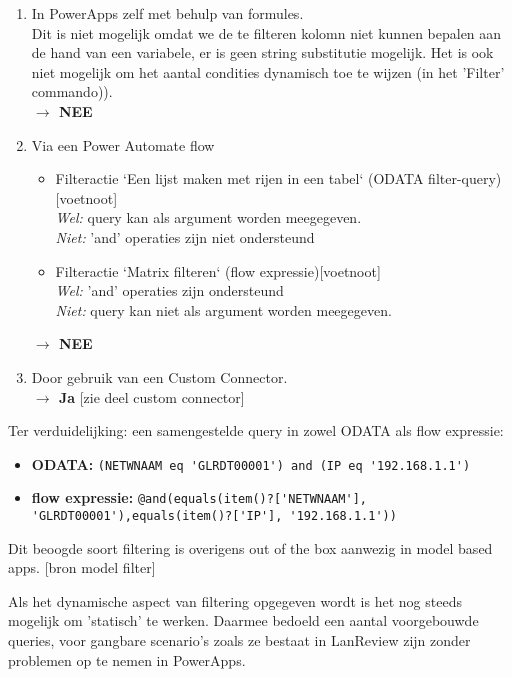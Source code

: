 \begin{enumerate}
    \item In PowerApps zelf met behulp van formules.\\
    Dit is niet mogelijk omdat we de te filteren kolomn niet kunnen bepalen aan de hand van een variabele, er is geen string substitutie mogelijk. Het is ook niet mogelijk om het aantal condities dynamisch toe te wijzen (in het 'Filter' commando)).\\
    \textbf{$\rightarrow$ NEE}
    \item Via een Power Automate flow
    \begin{itemize}
        \item Filteractie `Een lijst maken met rijen in een tabel` (ODATA filter-query)[voetnoot]\\ 
            \textit{Wel:}  query kan als argument worden meegegeven.\\
            \textit{Niet:} 'and' operaties zijn niet ondersteund
         \item Filteractie `Matrix filteren` (flow expressie)[voetnoot]\\
            \textit{Wel:} 'and' operaties zijn ondersteund\\
            \textit{Niet:} query kan niet als argument worden meegegeven.
    \end{itemize}
    \textbf{$\rightarrow$ NEE}
    \item Door gebruik van een Custom Connector.\\
    \textbf{$\rightarrow$ Ja}
    [zie deel custom connector]
\end{enumerate}

Ter verduidelijking: een samengestelde query in zowel ODATA als flow expressie:
\begin{itemize}
    \item \textbf{ODATA:} \lstinline|(NETWNAAM eq 'GLRDT00001') and (IP eq '192.168.1.1')|
    \item \textbf{flow expressie:} \lstinline|@and(equals(item()?['NETWNAAM'], 'GLRDT00001'),equals(item()?['IP'], '192.168.1.1'))|
\end{itemize}

Dit beoogde soort filtering is overigens out of the box aanwezig in model based apps. [bron model filter]

Als het dynamische aspect van filtering opgegeven wordt is het nog steeds mogelijk om 'statisch' te werken. Daarmee bedoeld een aantal voorgebouwde queries, voor gangbare scenario's zoals ze bestaat in LanReview zijn zonder problemen op te nemen in PowerApps.

